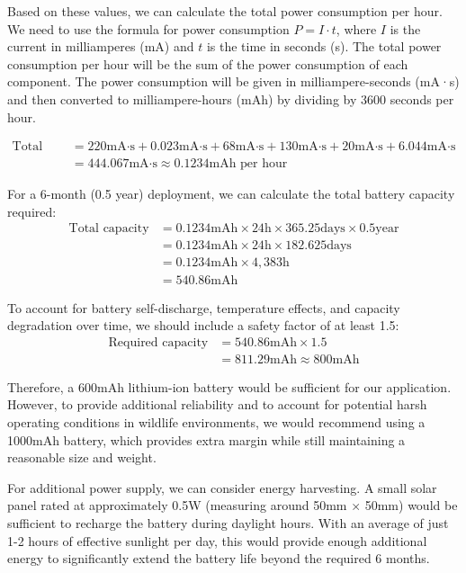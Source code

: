 Based on these values, we can calculate the total power consumption per hour.
We need to use the formula for power consumption $P = I \cdot t$, where $I$ is the current in milliamperes (mA) and $t$ is the time in seconds (s). The total power consumption per hour will be the sum of the power consumption of each component. The power consumption will be given in milliampere-seconds (mA·s) and then converted to milliampere-hours (mAh) by dividing by 3600 seconds per hour.

\begin{align*}
\text{Total per hour} &= 220\text{mA·s} + 0.023\text{mA·s} + 68\text{mA·s} + 130\text{mA·s} + 20\text{mA·s} + 6.044\text{mA·s} \\
&= 444.067\text{mA·s} \approx 0.1234\text{mAh per hour}
\end{align*}

For a 6-month (0.5 year) deployment, we can calculate the total battery capacity required:
\begin{align*}
\text{Total capacity} &= 0.1234\text{mAh} \times 24\text{h} \times 365.25\text{days} \times 0.5\text{year} \\
&= 0.1234\text{mAh} \times 24\text{h} \times 182.625\text{days} \\
&= 0.1234\text{mAh} \times 4,383\text{h} \\
&= 540.86\text{mAh}
\end{align*}

To account for battery self-discharge, temperature effects, and capacity degradation over time, we should include a safety factor of at least 1.5:
\begin{align*}
\text{Required capacity} &= 540.86\text{mAh} \times 1.5 \\
&= 811.29\text{mAh} \approx 800\text{mAh}
\end{align*}

Therefore, a 600mAh lithium-ion battery would be sufficient for our application. However, to provide additional reliability and to account for potential harsh operating conditions in wildlife environments, we would recommend using a 1000mAh battery, which provides extra margin while still maintaining a reasonable size and weight. %

For additional power supply, we can consider energy harvesting. 
A small solar panel rated at approximately 0.5W (measuring around 50mm × 50mm) would be sufficient to recharge the battery during daylight hours. With an average of just 1-2 hours of effective sunlight per day, this would provide enough additional energy to significantly extend the battery life beyond the required 6 months.

